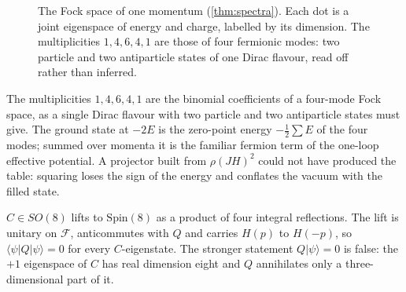 \begin{figure}[t]
\centering
{}
\caption{The Fock space of one momentum (\cref{thm:spectra}). Each dot is a joint eigenspace of energy and charge, labelled by its
dimension. The multiplicities $1,4,6,4,1$ are those of four fermionic modes: two particle and two antiparticle states of one Dirac
flavour, read off rather than inferred.}
\label{fig:fock}
\end{figure}

The multiplicities $1,4,6,4,1$ are the binomial coefficients of a four-mode Fock space, as a single Dirac flavour with two particle and
two antiparticle states must give. The ground state at $-2E$ is the zero-point energy $-\tfrac12\sum E$ of the four modes; summed over
momenta it is the familiar fermion term of the one-loop effective potential. A projector built from $\rho(JH)^2$ could not have
produced the table: squaring loses the sign of the energy and conflates the vacuum with the filled state.

\begin{proposition}
\label{prop:Cstates}
$C\in SO(8)$ lifts to $\mathrm{Spin}(8)$ as a product of four integral reflections. The lift is unitary on $\mathcal F$, anticommutes with
$Q$ and carries $H(p)$ to $H(-p)$, so $\langle\psi|Q|\psi\rangle=0$ for every $C$-eigenstate. The stronger statement $Q|\psi\rangle=0$ is
false: the $+1$ eigenspace of $C$ has real dimension eight and $Q$ annihilates only a three-dimensional part of it.
\end{proposition}

